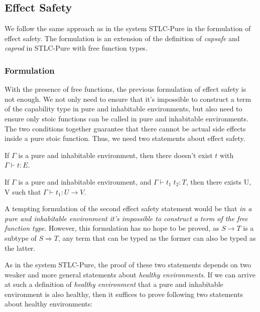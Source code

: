 \subsection{Effect Safety}

We follow the same approach as in the system STLC-Pure in the
formulation of effect safety. The formulation is an extension of the
definition of \emph{capsafe} and \emph{caprod} in STLC-Pure with free
function types.

\subsubsection{Formulation}

With the presence of free functions, the previous formulation of
effect safety is not enough. We not only need to ensure that it's
impossible to construct a term of the capability type in pure and
inhabitable environments, but also need to ensure only stoic functions
can be called in pure and inhabitable environments. The two conditions
together guarantee that there cannot be actual side effects inside a
pure stoic function. Thus, we need two statements about effect safety.

\begin{definition}
  If $\Gamma$ is a pure and inhabitable environment, then there
  doesn't exist $t$ with $\Gamma \vdash t : E$.
\end{definition}

\begin{definition}
  If $\Gamma$ is a pure and inhabitable environment, and
  $\Gamma \vdash t_1 \; t_2 : T$, then there exists U, V such that
  $\Gamma \vdash t_1 : U \to V$.
\end{definition}

A tempting formulation of the second effect safety statement would be
that \emph{in a pure and inhabitable environment it's impossible to
  construct a term of the free function type}. However, this
formulation has no hope to be proved, as $S \to T$ is a subtype of
$S \Rightarrow T$, any term that can be typed as the former can also
be typed as the latter.

As in the system STLC-Pure, the proof of these two statements depends
on two weaker and more general statements about \emph{healthy
  environments}. If we can arrive at such a definition of
\emph{healthy environment} that a pure and inhabitable environment is
also healthy, then it suffices to prove following two statements about
healthy environments:

